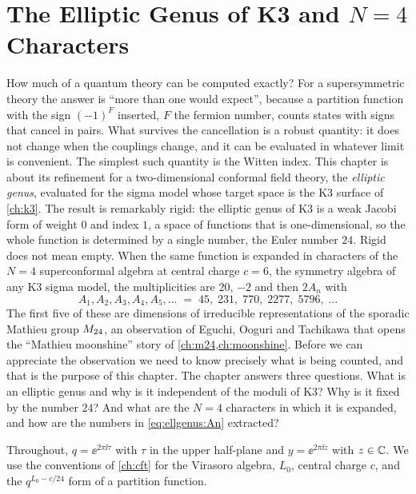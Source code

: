 \chapter{The Elliptic Genus of K3 and \texorpdfstring{$N=4$}{N = 4} Characters}\label{ch:ellgenus}

How much of a quantum theory can be computed exactly? For a supersymmetric theory the
answer is ``more than one would expect'', because a partition function with the sign
$(-1)^F$ inserted, $F$ the fermion number, counts states with signs that cancel in pairs.
What survives the cancellation is a robust quantity: it does not change when the couplings
change, and it can be evaluated in whatever limit is convenient. The simplest such quantity
is the Witten index. This chapter is about its refinement for a two-dimensional
conformal field theory, the \emph{elliptic genus}, evaluated for the sigma model whose
target space is the K3 surface of \cref{ch:k3}. The result is remarkably rigid: the elliptic
genus of K3 is a weak Jacobi form of weight $0$ and index $1$, a space of functions that is
one-dimensional, so the whole function is determined by a single number, the Euler number
$24$. Rigid does not mean empty. When the same function is expanded in characters of the
$N=4$ superconformal algebra at central charge $c=6$, the symmetry algebra of any K3 sigma
model, the multiplicities are $20$, $-2$ and then $2A_n$ with
\begin{equation}\label{eq:ellgenus:An}
 A_1,A_2,A_3,A_4,A_5,\dots \;=\;45,\;231,\;770,\;2277,\;5796,\;\dots
\end{equation}
The first five of these are dimensions of irreducible representations of the sporadic
Mathieu group $M_{24}$, an observation of Eguchi, Ooguri and Tachikawa
 that opens the ``Mathieu moonshine'' story of
\cref{ch:m24,ch:moonshine}. Before we can appreciate the observation we need to know
precisely what is being counted, and that is the purpose of this chapter. The chapter
answers three questions. What is an elliptic genus and why is it independent of the moduli
of K3? Why is it fixed by the number $24$? And what are the $N=4$ characters in which it
is expanded, and how are the numbers in \eqref{eq:ellgenus:An} extracted?

Throughout, $q=\ee^{2\pi\ii\tau}$ with $\tau$ in the upper half-plane and $y=\ee^{2\pi\ii z}$
with $z\in\mathbb{C}$. We use the conventions of \cref{ch:cft} for the Virasoro algebra, $L_0$,
central charge $c$, and the $q^{L_0-c/24}$ form of a partition function.

